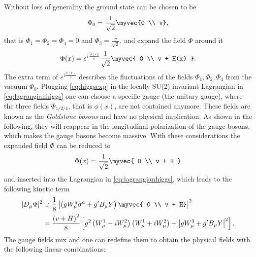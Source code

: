 Without loss of generality the ground state can be chosen to be
\begin{equation}
  \Phi_0 = \frac{1}{\sqrt{2}} \myvec{0 \\ v},
  \label{eq:groundstate}
\end{equation}
that is $\Phi_1 = \Phi_2 = \Phi_4 = 0$ and $\Phi_3 = \frac{v}{\sqrt{2}}$, 
and expand the field $\Phi$ around it
\begin{equation}
  \Phi(x) = e^{i\frac{\phi(x)}{v}}\frac{1}{\sqrt{2}} \myvec{ 0 \\ v + H(x) }.
    \label{eq:higgsexp}
\end{equation}
The extra term of $e^{i\frac{\phi(x)}{v}}$ describes the fluctuations of the fields $\Phi_1, \Phi_2, \Phi_4$ from the vacuum $\Phi_0$.
Plugging \cref{eq:higgsexp} in the locally SU(2) invariant Lagrangian in \cref{eq:lagrangianhiggs} one can choose a specific gauge (the unitary gauge), where the three fields $\Phi_{1/2/4}$, that is $\phi(x)$, are not contained anymore. These fields are known as the \emph{Goldstone bosons} and have no physical implication. As shown in the following, they will reappear in the longitudinal polarization of the gauge bosons, which makes the gauge bosons become massive.
With these considerations the expanded field $\Phi$ can be reduced to
\begin{equation}
  \Phi(x) = \frac{1}{\sqrt{2}} \myvec{ 0 \\ v + H }
\end{equation}
and inserted into the Lagrangian in \cref{eq:lagrangianhiggs}, which leads to the following kinetic term
\begin{align}
  |D_\mu\Phi|^2 & \supset \frac{1}{8} \left| \left( gW_\mu^a \sigma^a+g'B_\mu Y \right) \myvec{ 0 \\ v + H} \right|^2  \label{eq:lagrangianmasspre} \\
  &= \frac{ \left( v + H \right) ^2}{8} \left[ g^2 \left( W_\mu^1 - i W_\mu^2 \right) \left( W_\mu^1 + i W_\mu^2 \right) + \left| g W_\mu^3 + g' B_\mu Y \right|^2 \right].
  \label{eq:lagrangianmass}
\end{align}
The gauge fields mix and one can redefine them to obtain the physical fields with the following linear combinations:
